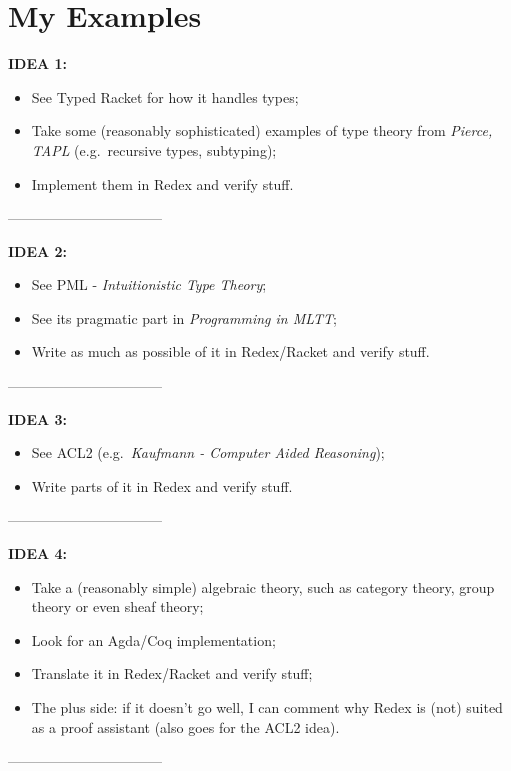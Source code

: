 \chapter{My Examples}

{\color{red} \indent\indent \textbf{IDEA 1:}
  \begin{itemize}
  \item See Typed Racket for how it handles types;
  \item Take some (reasonably sophisticated) examples of type theory from \emph{Pierce, TAPL}
    (e.g.\ recursive types, subtyping);
  \item Implement them in Redex and verify stuff.
  \end{itemize}

  ---------------------------------

  \textbf{IDEA 2:}
  \begin{itemize}
  \item See PML - \emph{Intuitionistic Type Theory};
  \item See its pragmatic part in \emph{Programming in MLTT};
  \item Write as much as possible of it in Redex/Racket and verify stuff.
  \end{itemize}

  ---------------------------------

  \textbf{IDEA 3:}
  \begin{itemize}
  \item See ACL2 (e.g.\ \emph{Kaufmann - Computer Aided Reasoning});
  \item Write parts of it in Redex and verify stuff.
  \end{itemize}

  ---------------------------------

  \textbf{IDEA 4:}
  \begin{itemize}
  \item Take a (reasonably simple) algebraic theory, such as category theory,
    group theory or even sheaf theory;
  \item Look for an Agda/Coq implementation;
  \item Translate it in Redex/Racket and verify stuff;
  \item The plus side: if it doesn't go well, I can comment why Redex is (not)
    suited as a proof assistant (also goes for the ACL2 idea).
  \end{itemize}

  ---------------------------------

}
